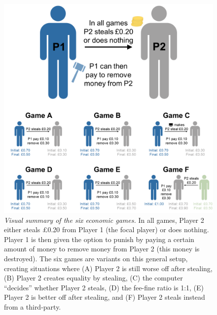 \documentclass[
  man,floatsintext]{apa6}
\begin{document}
\begin{figure}
\includegraphics[width=1\linewidth]{images/games} \caption{\emph{Visual summary of the six economic games.} In all
games, Player 2 either steals £0.20 from Player 1 (the focal player) or does
nothing. Player 1 is then given the option to punish by paying a certain amount
of money to remove money from Player 2 (this money is destroyed). The six games
are variants on this general setup, creating situations where (A) Player 2 is
still worse off after stealing, (B) Player 2 creates equality by stealing, (C)
the computer ``decides'' whether Player 2 steals, (D) the fee-fine ratio is 1:1,
(E) Player 2 is better off after stealing, and (F) Player 2 steals instead from
a third-party.}\label{fig:plotGames}
\end{figure}
\end{document}
